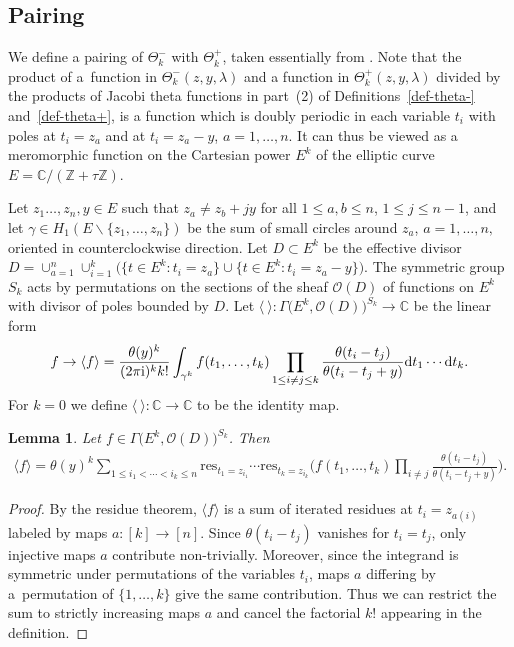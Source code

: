 \documentclass[pdftex]{sigma}
\numberwithin{equation}{section}
\newtheorem{Lemma}[Theorem]{Lemma}
\begin{document}
\subsection{Pairing}
We define a pairing of $\Theta^-_k$ with $\Theta^+_k$, taken essentially from \cite[Appendix~C]{TV2}. Note that the product of a~function in $\Theta^-_k(z,y,\lambda)$ and a function in $\Theta^+_k(z,y,\lambda)$ divided by the products of Jacobi theta functions in part~(2) of Definitions~\ref{def-theta-} and~\ref{def-theta+}, is a function which is doubly periodic in each variable $t_i$ with poles at $t_i=z_a$ and at $t_i=z_a-y$, $a=1,\dots,n$. It can thus be viewed as a meromorphic function on the Cartesian power $E^k$ of the elliptic curve $E=\mathbb C/(\mathbb Z+\tau\mathbb Z)$.
\begin{Definition} Let $z_1\dots,z_n,y\in E$ such that $z_a\neq z_b+jy$ for all $1\leq a,b\leq n$, $1\leq j\leq n-1$, and let $\gamma\in H_1(E\smallsetminus\{z_1,\dots,z_n\})$ be the sum of small circles around $z_a$, $a=1,\dots,n,$ oriented in counterclockwise direction. Let $D\subset E^k$ be the effective divisor $D=\cup_{a=1}^n\cup_{i=1}^k\big(\big\{t\in E^k\colon t_i=z_a\big\}\cup\big\{t\in E^k\colon t_i=z_a-y\big\}\big)$. The symmetric group $S_k$ acts by permutations on the sections of the sheaf $\mathcal O(D)$ of functions on $E^k$ with divisor of poles bounded by $D$. Let $\langle \ \rangle\colon\Gamma\big(E^k,\mathcal O(D)\big)^{S_k}\to \mathbb C$ be the linear form
 \begin{gather*}
 f\to\langle f\rangle= \frac{\theta(y)^k}{(2\pi{\rm i})^kk!} \int_{\gamma^k} f(t_1,\dots,t_k)\prod_{1\leq i\neq j\leq k} \frac{\theta(t_i-t_j)} {\theta(t_i-t_j+y)}{\rm d}t_1\cdots {\rm d}t_k.
 \end{gather*}
For $k=0$ we define $\langle \ \rangle\colon\mathbb C\to\mathbb C$ to be the identity map.
\end{Definition}
\begin{Lemma}\label{lemma-2} Let $f\in\Gamma\big(E^k,\mathcal O(D)\big)^{S_k}$. Then
 \begin{gather*}
 \langle f\rangle=\theta(y)^k\sum_{1\leq i_1<\cdots<i_k\leq n}\mathrm{res}_{t_1=z_{i_1}}\cdots\mathrm{res}_{t_k=z_{i_k}} \bigg(f(t_1,\dots,t_k)\prod_{i\neq j} \frac{\theta(t_i-t_j)} {\theta(t_i-t_j+y)}\bigg).
 \end{gather*}
\end{Lemma}
\begin{proof} By the residue theorem, $\langle f\rangle$ is a sum of iterated residues at $t_i=z_{a(i)}$ labeled by maps $a\colon [k]\to[n]$. Since $\theta(t_i-t_j)$ vanishes for $t_i=t_j$, only injective maps $a$ contribute non-trivially. Moreover, since the integrand is symmetric under permutations of the variables $t_i$, maps $a$ differing by a~permutation of $\{1,\dots,k\}$ give the same contribution. Thus we can restrict the sum to strictly increasing maps $a$ and cancel the factorial $k!$ appearing in the definition.
\end{proof}
\end{document}
